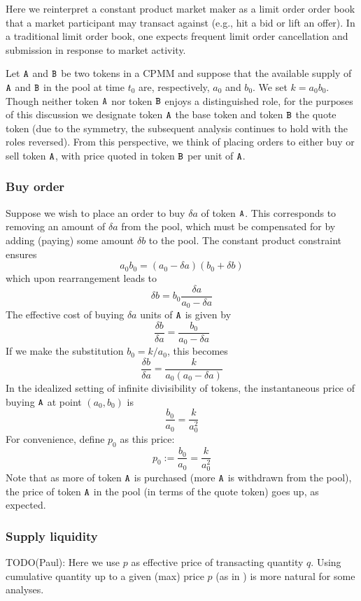 \documentclass[11pt, reqno]{amsart}
\theoremstyle{definition}
\theoremstyle{remark}
\newcommand{\tA}{\textnormal{\texttt{A}}}
\newcommand{\tB}{\textnormal{\texttt{B}}}
\begin{document}
Here we reinterpret a constant product market maker as a limit order order book
that a market participant may transact against (e.g., hit a bid or lift an
offer). In a traditional limit order book, one expects frequent limit order
cancellation and submission in response to market activity.

Let $\tA$ and $\tB$ be two tokens in a CPMM and suppose that the available
supply of $\tA$ and $\tB$ in the pool at time $t_0$ are, respectively,
$a_0$ and $b_0$. We set $k = a_0 b_0$. Though neither token $\tA$ nor token
$\tB$ enjoys a distinguished role, for the purposes of this discussion we
designate token $\tA$ the base token and token $\tB$ the quote token
(due to the symmetry, the subsequent analysis continues to hold with the roles
reversed). From this perspective, we think of placing orders to either buy or
sell token $\tA$, with price quoted in token $\tB$ per unit of $\tA$.

\subsubsection{Buy order}
Suppose we wish to place an order to buy $\delta a$ of token $\tA$. This
corresponds to removing an amount of $\delta a$ from the pool, which must
be compensated for by adding (paying) some amount $\delta b$ to the pool.
The constant product constraint ensures
\[
	a_0 b_0 = (a_0 - \delta a) (b_0 + \delta b)
\]
which upon rearrangement leads to
\[
	\delta b = b_0 \frac{\delta a}{a_0 - \delta a}
\]
The effective cost of buying $\delta a$ units of $\tA$ is given by
\[
	\frac{\delta b}{\delta a} = \frac{b_0}{a_0 - \delta a}
\]
If we make the substitution $b_0 = k / a_0$, this becomes
\[
	\frac{\delta b}{\delta a} = \frac{k}{a_0(a_0 - \delta a)}
\]
In the idealized setting of infinite divisibility of tokens, the
instantaneous price of buying $\tA$ at point $(a_0, b_0)$ is
\[
	\frac{b_0}{a_0} = \frac{k}{a_0^2}
\]
For convenience, define $p_0$ as this price:
\[
    p_0 := \frac{b_0}{a_0} = \frac{k}{a_0^2}
\]
Note that as more of token $\tA$ is purchased (more $\tA$ is withdrawn from
the pool), the price of token $\tA$ in the pool (in terms of the quote token)
goes up, as expected.

\subsubsection{Supply liquidity}
TODO(Paul): Here we use $p$ as effective price of transacting quantity $q$.
Using cumulative quantity up to a given (max) price $p$ (as in \cite{Yo20}) is
more natural for some analyses.
\end{document}
